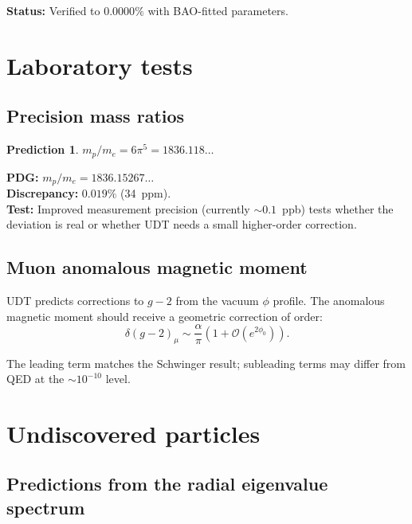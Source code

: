 \documentclass[11pt,letterpaper]{article}
\newtheorem{prediction}[theorem]{Prediction}
\numberwithin{equation}{section}
\begin{document}
\noindent\textbf{Status:} Verified to $0.0000\%$ with BAO-fitted parameters.

\section{Laboratory tests}
\label{sec:laboratory}

\subsection{Precision mass ratios}

\begin{prediction}
$m_p/m_e = 6\pi^5 = 1836.118\ldots$
\end{prediction}

\noindent\textbf{PDG:} $m_p/m_e = 1836.15267\ldots$\\
\textbf{Discrepancy:} $0.019\%$ (34~ppm).\\
\textbf{Test:} Improved measurement precision (currently $\sim 0.1$~ppb)
tests whether the deviation is real or whether UDT needs a small
higher-order correction.

\subsection{Muon anomalous magnetic moment}

UDT predicts corrections to $g-2$ from the vacuum $\phi$ profile. The
anomalous magnetic moment should receive a geometric correction of order:
\begin{equation}
  \delta(g-2)_\mu \sim \frac{\alpha}{\pi}\left(1 + \mathcal{O}(e^{2\phi_0})\right).
\end{equation}

The leading term matches the Schwinger result; subleading terms may differ
from QED at the $\sim 10^{-10}$ level.

\section{Undiscovered particles}
\label{sec:undiscovered}

\subsection{Predictions from the radial eigenvalue spectrum}
\end{document}
